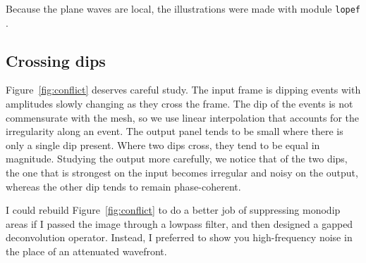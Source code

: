 %

Because the plane waves are local,
the illustrations were made with module 
\texttt{lopef} .

\subsection{Crossing dips}
Figure~\ref{fig:conflict} deserves careful study.
The input frame is dipping events with
amplitudes slowly changing as they cross the frame.
The dip of the events is not commensurate with the mesh,
so we use linear interpolation
that accounts for the irregularity along an event.
The output panel tends to be small where there is only a single dip present.
Where two dips cross, they tend to be equal in magnitude.
Studying the output more carefully,
we notice that of the two dips,
the one that is strongest on the input
becomes irregular and noisy on the output,
whereas the other dip tends to remain phase-coherent.
\par
I could rebuild Figure~\ref{fig:conflict} 
to do a better job of suppressing monodip areas
if I passed the image through a lowpass filter,
and then designed a gapped deconvolution operator.
Instead, I preferred to show you high-frequency noise
in the place of an attenuated wavefront.

